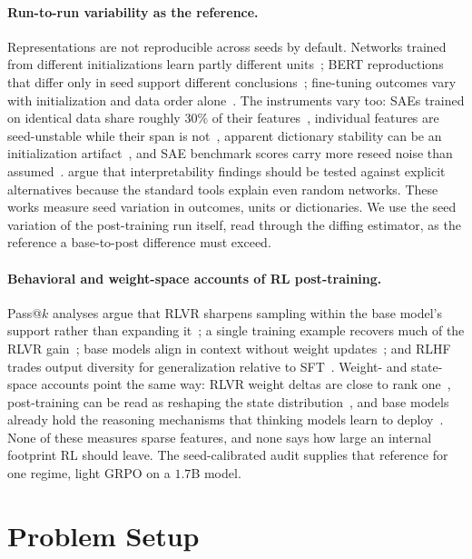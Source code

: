 \documentclass{article}
\begin{document}
\paragraph{Run-to-run variability as the reference.} Representations are not reproducible across seeds by default. Networks trained from different initializations learn partly different units~\citep{li2016convergent}; BERT reproductions that differ only in seed support different conclusions~\citep{sellam2022multiberts}; fine-tuning outcomes vary with initialization and data order alone~\citep{dodge2020finetuning}. The instruments vary too: SAEs trained on identical data share roughly $30\%$ of their features~\citep{paulo2025different}, individual features are seed-unstable while their span is not~\citep{unstable_subspaces2026}, apparent dictionary stability can be an initialization artifact~\citep{brzozowski2026ablating}, and SAE benchmark scores carry more reseed noise than assumed~\citep{chanin2026saebench}. \citet{dead_salmons2026} argue that interpretability findings should be tested against explicit alternatives because the standard tools explain even random networks. These works measure seed variation in outcomes, units or dictionaries. We use the seed variation of the post-training run itself, read through the diffing estimator, as the reference a base-to-post difference must exceed.

\paragraph{Behavioral and weight-space accounts of RL post-training.} Pass@$k$ analyses argue that RLVR sharpens sampling within the base model's support rather than expanding it~\citep{yue2025}; a single training example recovers much of the RLVR gain~\citep{wang2025}; base models align in context without weight updates~\citep{lin2024}; and RLHF trades output diversity for generalization relative to SFT~\citep{kirk2024diversity}. Weight- and state-space accounts point the same way: RLVR weight deltas are close to rank one~\citep{relex_rank1_rlvr2026}, post-training can be read as reshaping the state distribution~\citep{posttraining_states_not_tokens2026}, and base models already hold the reasoning mechanisms that thinking models learn to deploy~\citep{venhoff2026base_reason}. None of these measures sparse features, and none says how large an internal footprint RL should leave. The seed-calibrated audit supplies that reference for one regime, light GRPO on a $1.7$B model.

\section{Problem Setup}
\label{sec:method}
\end{document}
